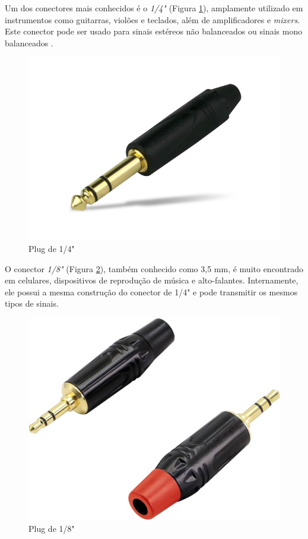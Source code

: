 Um dos conectores mais conhecidos é o \textit{1/4"} (Figura \ref{fig19}), amplamente utilizado em instrumentos como guitarras, violões e teclados, além de amplificadores e \textit{mixers}. Este conector pode ser usado para sinais estéreos não balanceados ou sinais mono balanceados \cite{bartlett}.

\begin{figure}[h]
	\centering
    \includegraphics[scale=0.2]{figuras/fig19.png}
	\caption{Plug de 1/4" \cite{mouser}}
	\label{fig19}
\end{figure}

O conector \textit{1/8"} (Figura \ref{fig20}), também conhecido como 3,5 mm, é muito encontrado em celulares, dispositivos de reprodução de música e alto-falantes. Internamente, ele possui a mesma construção do conector de 1/4" e pode transmitir os mesmos tipos de sinais.

\begin{figure}[h]
	\centering
    \includegraphics[scale=0.2]{figuras/fig20.png}
	\caption{Plug de 1/8" \cite{mouser}}
	\label{fig20}
\end{figure}

